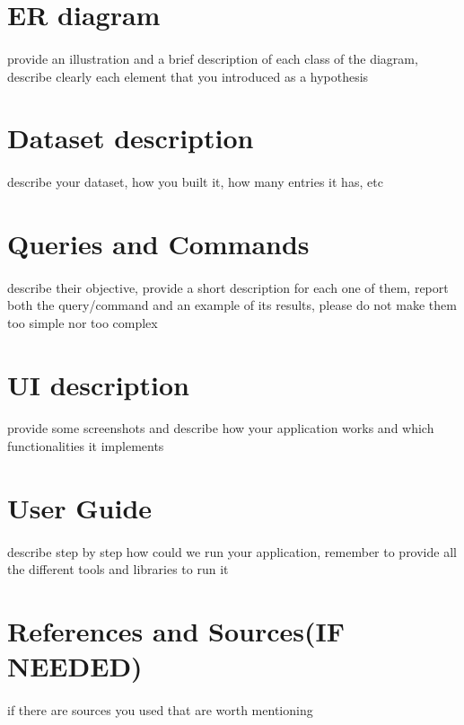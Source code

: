 \documentclass[a4paper,12pt]{article}
\begin{document}
\section{ER diagram}
\paragraph{} provide an illustration and a brief description of each class of the diagram, describe clearly each element that you introduced as a hypothesis
\section{Dataset description}
\paragraph{} describe your dataset, how you built it, how many entries it has, etc
\section{Queries and Commands}
\paragraph{}describe their objective, provide a short description for each one of them, report both the query/command and an example of its results, please do not make them too simple nor too complex
\section{UI description}
\paragraph{}provide some screenshots and describe how your application works and which functionalities it implements
\section{User Guide} 
\paragraph{} describe step by step how could we run your application, remember to provide all the different tools and libraries to run it
\section{References and Sources(IF NEEDED)}
\paragraph{}if there are sources you used that are worth mentioning
\end{document}
